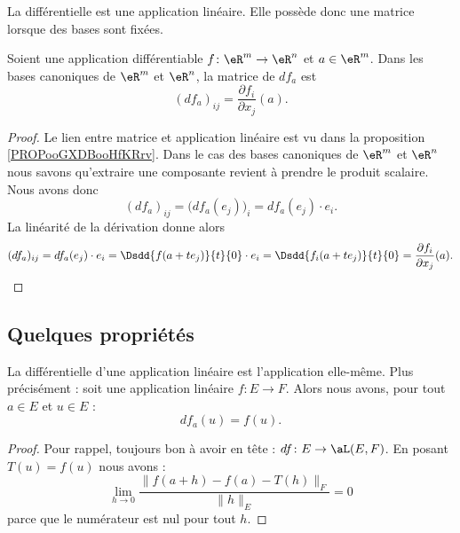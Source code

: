 La différentielle est une application linéaire. Elle possède donc une matrice lorsque des bases sont fixées.
\begin{proposition}     \label{PROPooBMROooThgLuU}
	Soient une application différentiable \( f\colon \eR^m\to \eR^n\) et \( a\in \eR^m\). Dans les bases canoniques de \( \eR^m\) et \( \eR^n\), la matrice de \( df_a\) est
	\begin{equation}
		(df_a)_{ij}=\frac{ \partial f_i }{ \partial x_j }(a).
	\end{equation}
\end{proposition}

\begin{proof}
	Le lien entre matrice et application linéaire est vu dans la proposition \ref{PROPooGXDBooHfKRrv}. Dans le cas des bases canoniques de \( \eR^m\) et \( \eR^n\) nous savons qu'extraire une composante revient à prendre le produit scalaire. Nous avons donc
	\begin{equation}
		(df_a)_{ij}=\big( df_a(e_j) \big)_i=df_a(e_j)\cdot e_i.
	\end{equation}
	La linéarité de la dérivation donne alors
	\begin{equation}
		(df_a)_{ij}=df_a(e_j)\cdot e_i=\Dsdd{ f(a+te_j) }{t}{0}\cdot e_i=\Dsdd{ f_i(a+te_j) }{t}{0}=\frac{ \partial f_i }{ \partial x_j }(a).
	\end{equation}
\end{proof}

\subsection{Quelques propriétés}

\begin{lemma}       \label{LEMooZSNMooCfjzOB}
	La différentielle d'une application linéaire est l'application elle-même. Plus précisément : soit une application linéaire \( f\colon E\to F\). Alors nous avons, pour tout \( a\in E\) et \( u\in E\) :
	\begin{equation}
		df_a(u)=f(u).
	\end{equation}
\end{lemma}

\begin{proof}
	Pour rappel, toujours bon à avoir en tête : \( df\colon E\to \aL(E,F)\). En posant \( T(u)=f(u)\) nous avons :
	\begin{equation}
		\lim_{h\to 0} \frac{ \| f(a+h)-f(a)- T(h) \|_F }{ \| h \|_E }=0
	\end{equation}
	parce que le numérateur est nul pour tout \( h\).
\end{proof}



